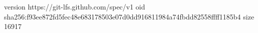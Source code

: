 version https://git-lfs.github.com/spec/v1
oid sha256:f93ee872fd5fec48e683178503e07d0dd916811984a74fbdd82558ffff1185b4
size 16917
